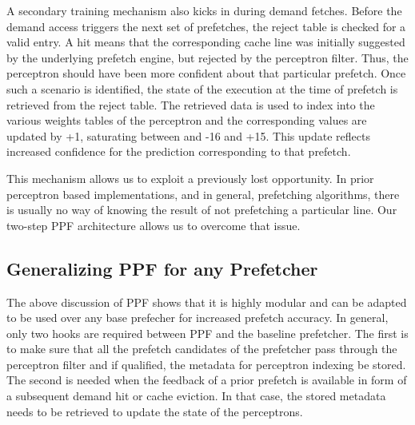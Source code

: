 A secondary training mechanism also kicks in during demand fetches.
Before the demand access triggers the next set of prefetches, the
reject table is checked for a valid entry.  A hit means that the
corresponding cache line was initially suggested by the underlying
prefetch engine, but rejected by the perceptron filter.  Thus, the
perceptron should have been more confident about that particular
prefetch.  Once such a scenario is identified, the
state %
of the execution at the time of prefetch is retrieved from the reject
table.  The retrieved data is used to index into the various weights
tables of the perceptron and the corresponding values are updated by
+1, saturating between and -16 and +15.  This update reflects
increased confidence for the prediction corresponding to that
prefetch.

This mechanism allows us to exploit a previously lost opportunity.  In
prior perceptron based implementations, and in general, prefetching
algorithms, there is usually no way of knowing the result of not
prefetching a particular line.  Our two-step PPF architecture allows
us to overcome that issue.

\subsection{Generalizing PPF for any Prefetcher}
\label{Arch-Generalizing}
The above discussion of PPF shows that it is highly modular and can be
adapted to be used over any base prefecher for increased prefetch
accuracy.  In general, only two hooks are required between PPF and the
baseline prefetcher. The first is to make sure that all the prefetch
candidates of the prefetcher pass through the perceptron filter and if
qualified, the metadata for perceptron indexing be stored. The second
is needed when the feedback of a prior prefetch is available in form
of a subsequent demand hit or cache eviction. In that case, the stored
metadata needs to be retrieved to update the state of the perceptrons.

